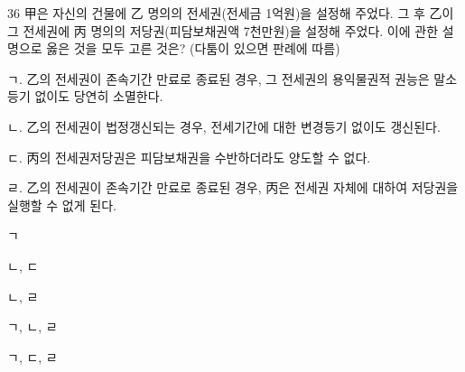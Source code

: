 \begin{question}{36}
甲은 자신의 건물에 乙 명의의 전세권(전세금 1억원)을 설정해 주었다. 그 후 乙이 그 전세권에 丙 명의의 저당권(피담보채권액 7천만원)을 설정해 주었다. 이에 관한 설명으로 옳은 것을 모두 고른 것은? (다툼이 있으면 판례에 따름)
\begin{framedtext}
ㄱ. 乙의 전세권이 존속기간 만료로 종료된 경우, 그 전세권의 용익물권적 권능은 말소등기 없이도 당연히 소멸한다. \par
ㄴ. 乙의 전세권이 법정갱신되는 경우, 전세기간에 대한 변경등기 없이도 갱신된다. \par
ㄷ. 丙의 전세권저당권은 피담보채권을 수반하더라도 양도할 수 없다. \par
ㄹ. 乙의 전세권이 존속기간 만료로 종료된 경우, 丙은 전세권 자체에 대하여 저당권을 실행할 수 없게 된다. \par
\end{framedtext}
\begin{choices}
  \item ㄱ
  \item ㄴ, ㄷ
  \item ㄴ, ㄹ
  \item ㄱ, ㄴ, ㄹ
  \item ㄱ, ㄷ, ㄹ
\end{choices}
\end{question}
